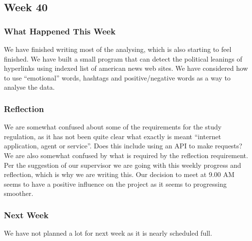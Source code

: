 \subsection{Week 40}
\subsubsection{What Happened This Week}
We have finished writing most of the analysing, which is also starting to feel
finished. We have built a small program that can detect the political leanings
of hyperlinks using indexed list of american news web sites. We have considered
how to use ``emotional'' words, hashtags and positive/negative words as a way to
analyse the data.

\subsubsection{Reflection}
We are somewhat confused about some of the requirements for the study
regulation, as it has not been quite clear what exactly is meant ``internet
application, agent or service''. Does this include using an API to make
requests? We are also somewhat confused by what is required by the reflection
requirement. Per the suggestion of our supervisor we are going with this weekly
progress and reflection, which is why we are writing this. Our decision to meet
at 9.00 AM seems to have a positive influence on the project as it seems to
progressing smoother.

\subsubsection{Next Week} 
We have not planned a lot for next week as it is nearly scheduled full.



% 

